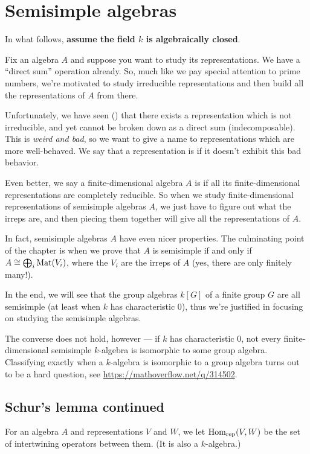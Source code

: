 \chapter{Semisimple algebras}
\label{ch:semisimple_algebras}
In what follows, \textbf{assume the field $k$ is algebraically closed}.

Fix an algebra $A$ and suppose
you want to study its representations.
We have a ``direct sum'' operation already.
So, much like we pay special attention to prime numbers,
we're motivated to study irreducible representations
and then build all the representations of $A$ from there.

Unfortunately, we have seen ()
that there exists a representation which is not irreducible,
and yet cannot be broken down as a direct sum (indecomposable).
This is \emph{weird and bad}, so we want to give a name
to representations which are more well-behaved.
We say that a representation is 
if it doesn't exhibit this bad behavior.

Even better, we say a finite-dimensional algebra $A$
is  if all its finite-dimensional
representations are completely reducible.
So when we study finite-dimensional representations of
semisimple algebras $A$,
we just have to figure out what the irreps are,
and then piecing them together will give all
the representations of $A$.

In fact, semisimple algebras $A$ have even nicer properties.
The culminating point of the chapter is when we prove that
$A$ is semisimple if and only if $A \cong \bigoplus_i \mathrm{Mat}(V_i)$,
where the $V_i$ are the irreps of $A$
(yes, there are only finitely many!).

In the end, we will see that the group algebras $k[G]$ of a finite group $G$ are
all semisimple (at least when $k$ has characteristic $0$), thus we're justified in
focusing on studying the semisimple algebras.

\begin{remark}
	[Digression]
	The converse does not hold, however --- if $k$ has characteristic $0$, not
	every finite-dimensional semisimple $k$-algebra is isomorphic to some group algebra.
	Classifying exactly when a $k$-algebra is isomorphic to a group algebra
	turns out to be a hard question, see \url{https://mathoverflow.net/q/314502}.
\end{remark}

\section{Schur's lemma continued}
\begin{definition}
	For an algebra $A$ and representations $V$ and $W$,
	we let $\operatorname{Hom}_{\mathrm{rep}}(V,W)$ be the set of intertwining operators between them.
	(It is also a $k$-algebra.)
\end{definition}

